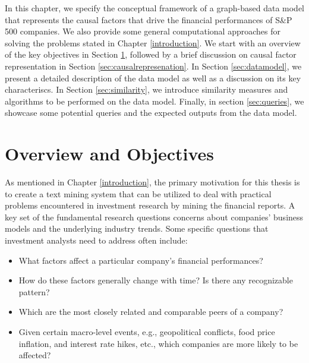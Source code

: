 
In this chapter, we specify the conceptual framework of a graph-based data model that represents the causal factors that drive the financial performances of S\&P 500 companies. We also provide some general computational approaches for solving the problems stated in Chapter \ref{introduction}. We start with an overview of the key objectives in Section \ref{sec:overview}, followed by a brief discussion on causal factor representation in Section \ref{sec:causalrepresenation}. In Section \ref{sec:datamodel}, we present a detailed description of the data model as well as a discussion on its key characteriscs. In Section \ref{sec:similarity}, we introduce similarity measures and algorithms to be performed on the data model. Finally, in section \ref{sec:queries}, we showcase some potential queries and the expected outputs from the data model.


\section{Overview and Objectives} \label{sec:overview} 

As mentioned in Chapter \ref{introduction}, the primary motivation for this thesis is to create a text mining system that can be utilized to deal with practical problems encountered in investment research by mining the financial reports. A key set of the fundamental research questions concerns about companies' business models and the underlying industry trends. Some specific questions that investment analysts need to address often include:

\begin{itemize}
\item	What factors affect a particular company's financial performances? 
\item	How do these factors generally change with time? Is there any recognizable pattern?
\item     Which are the most closely related and comparable peers of a company?
\item	Given certain macro-level events, e.g., geopolitical conflicts, food price inflation, and interest rate hikes, etc., which companies are more likely to be affected?
\end{itemize}

